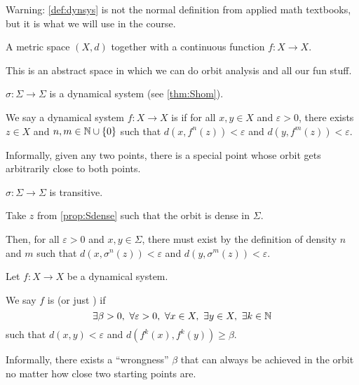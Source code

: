 \documentclass[class=pmath370,tikz,notes]{agony}
\begin{document}
Warning: \cref{def:dynsys} is not the normal definition from applied math textbooks,
but it is what we will use in the course.

\begin{defn}
  A metric space $(X,d)$ together with a continuous function $f : X \to X$.
  \label{def:dynsys}
\end{defn}

This is an abstract space in which we can do orbit analysis and all our fun stuff.

\begin{example}
  $\sigma : \Sigma \to \Sigma$ is a dynamical system (see \cref{thm:Shom}).
\end{example}

\begin{defn}[transitivity]
  We say a dynamical system $f : X \to X$ is 
  if for all $x,y \in X$ and $\varepsilon > 0$,
  there exists $z \in X$ and $n,m \in \mathbb{N} \cup \{0\}$
  such that $d(x,f^n(z)) < \varepsilon$ and $d(y,f^m(z)) < \varepsilon$.
\end{defn}

Informally, given any two points, there is a special point whose orbit
gets arbitrarily close to both points.

\begin{prop}
  $\sigma : \Sigma \to \Sigma$ is transitive.
\end{prop}
\begin{prf}
  Take $z$ from \cref{prop:Sdense} such that the orbit is dense in $\Sigma$.

  Then, for all $\varepsilon > 0$ and $x,y \in \Sigma$,
  there must exist by the definition of density $n$ and $m$ such that
  $d(x,\sigma^n(z)) < \varepsilon$ and $d(y,\sigma^m(z)) < \varepsilon$.
\end{prf}

\begin{defn*}
  Let $f : X \to X$ be a dynamical system.
  
  We say $f$ is 
  (or just ) if
  \[ \exists \beta > 0,\ \forall \varepsilon > 0,\ \forall x \in X,\ \exists y \in X,\ \exists k \in \N \]
  such that $d(x,y) < \varepsilon$ and $d(f^k(x),f^k(y)) \geq \beta$.
\end{defn*}

Informally, there exists a ``wrongness'' $\beta$ that can always be 
achieved in the orbit no matter how close two starting points are.
\end{document}
